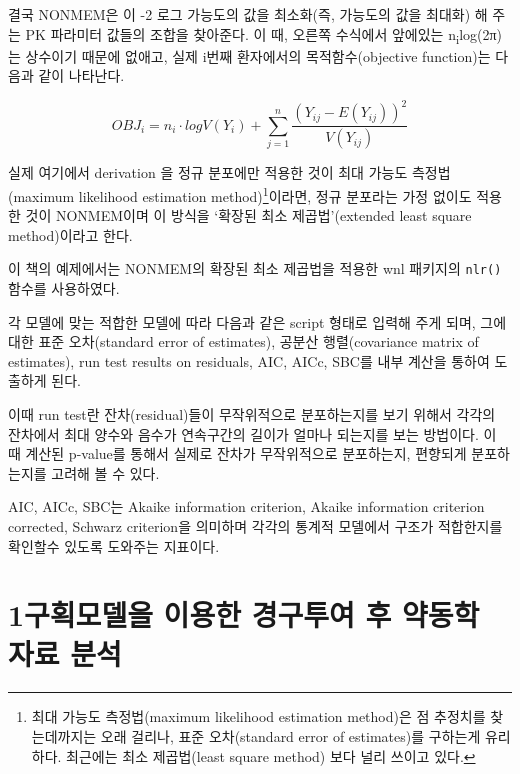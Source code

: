 \documentclass[
  11pt,
  krantz2, a4paper, twoside]{krantz}
\theoremstyle{definition}
\theoremstyle{definition}
\theoremstyle{definition}
\theoremstyle{definition}
\theoremstyle{remark}
\begin{document}
결국 NONMEM은 이 -2 로그 가능도의 값을 최소화(즉, 가능도의 값을 최대화) 해 주는 PK 파라미터 값들의 조합을 찾아준다.
이 때, 오른쪽 수식에서 앞에있는 n\textsubscript{i}log(2π)는 상수이기 때문에 없애고, 실제 i번째 환자에서의 목적함수(objective function)는 다음과 같이 나타난다.

\begin{equation}
OBJ_i = n_i \cdot logV(Y_i) + \sum_{j=1}^{n} \frac{(Y_{ij} - E(Y_{ij}))^2}{V(Y_{ij})}
\label{eq:eq5-4}
\end{equation}

실제 여기에서 derivation 을 정규 분포에만 적용한 것이 최대 가능도 측정법(maximum likelihood estimation method)\footnote{최대 가능도 측정법(maximum likelihood estimation method)은 점 추정치를 찾는데까지는 오래 걸리나, 표준 오차(standard error of estimates)를 구하는게 유리하다. 최근에는 최소 제곱법(least square method) 보다 널리 쓰이고 있다.}이라면, 정규 분포라는 가정 없이도 적용한 것이 NONMEM이며 이 방식을 `확장된 최소 제곱법'(extended least square method)이라고 한다. 

이 책의 예제에서는 NONMEM의 확장된 최소 제곱법을 적용한 wnl 패키지의 \texttt{nlr()} 함수를 사용하였다.

각 모델에 맞는 적합한 모델에 따라 다음과 같은 script 형태로 입력해 주게 되며, 그에 대한 표준 오차(standard error of estimates), 공분산 행렬(covariance matrix of estimates), run test results on residuals, AIC, AICc, SBC를 내부 계산을 통하여 도출하게 된다.

이때 run test란 잔차(residual)들이 무작위적으로 분포하는지를 보기 위해서 각각의
잔차에서 최대 양수와 음수가 연속구간의 길이가 얼마나 되는지를 보는
방법이다. 이 때 계산된 p-value를 통해서 실제로 잔차가 무작위적으로 분포하는지, 편향되게 분포하는지를 고려해 볼 수 있다.

AIC, AICc, SBC는 Akaike information criterion, Akaike information
criterion corrected, Schwarz criterion을 의미하며 각각의 통계적 모델에서
구조가 적합한지를 확인할수 있도록 도와주는 지표이다.

\hypertarget{uxad6cuxd68duxbaa8uxb378uxc744-uxc774uxc6a9uxd55c-uxacbduxad6cuxd22cuxc5ec-uxd6c4-uxc57duxb3d9uxd559-uxc790uxb8cc-uxbd84uxc11d}{%
\section{\texorpdfstring{1구획모델을 이용한 경구투여 후 약동학 자료 분석}{1구획모델을 이용한 경구투여 후 약동학 자료 분석}}\label{uxad6cuxd68duxbaa8uxb378uxc744-uxc774uxc6a9uxd55c-uxacbduxad6cuxd22cuxc5ec-uxd6c4-uxc57duxb3d9uxd559-uxc790uxb8cc-uxbd84uxc11d}}
\end{document}
